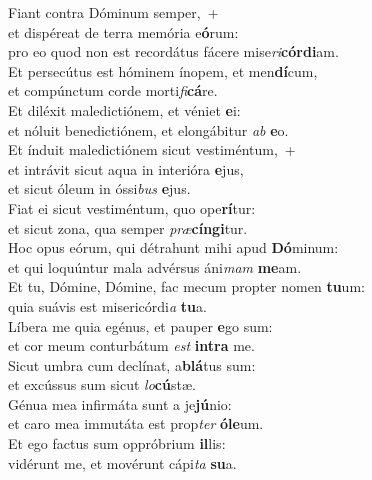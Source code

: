 \evenverse Fiant contra Dóminum semper,~+\\
\evenverse  et dispéreat de terra memória e\textbf{ó}rum:~\*\\
\evenverse pro eo quod non est recordátus fácere mise\textit{ri}\textbf{cór}\textbf{di}am.\\
\oddverse Et persecútus est hóminem ínopem, et men\textbf{dí}cum,~\*\\
\oddverse et compúnctum corde morti\textit{fi}\textbf{cá}re.\\
\evenverse Et diléxit maledictiónem, et véniet \textbf{e}i:~\*\\
\evenverse et nóluit benedictiónem, et elongábitur \textit{ab} \textbf{e}o.\\
\oddverse Et índuit maledictiónem sicut vestiméntum,~+\\
\oddverse  et intrávit sicut aqua in interióra \textbf{e}jus,~\*\\
\oddverse et sicut óleum in óssi\textit{bus} \textbf{e}jus.\\
\evenverse Fiat ei sicut vestiméntum, quo ope\textbf{rí}tur:~\*\\
\evenverse et sicut zona, qua semper \textit{præ}\textbf{cín}\textbf{gi}tur.\\
\oddverse Hoc opus eórum, qui détrahunt mihi apud \textbf{Dó}minum:~\*\\
\oddverse et qui loquúntur mala advérsus áni\textit{mam} \textbf{me}am.\\
\evenverse Et tu, Dómine, Dómine, fac mecum propter nomen \textbf{tu}um:~\*\\
\evenverse quia suávis est misericórdi\textit{a} \textbf{tu}a.\\
\oddverse Líbera me quia egénus, et pauper \textbf{e}go sum:~\*\\
\oddverse et cor meum conturbátum \textit{est} \textbf{in}\textbf{tra} me.\\
\evenverse Sicut umbra cum declínat, a\textbf{blá}tus sum:~\*\\
\evenverse et excússus sum sicut \textit{lo}\textbf{cú}stæ.\\
\oddverse Génua mea infirmáta sunt a je\textbf{jú}nio:~\*\\
\oddverse et caro mea immutáta est prop\textit{ter} \textbf{ó}\textbf{le}um.\\
\evenverse Et ego factus sum oppróbrium \textbf{il}lis:~\*\\
\evenverse vidérunt me, et movérunt cápi\textit{ta} \textbf{su}a.\\
